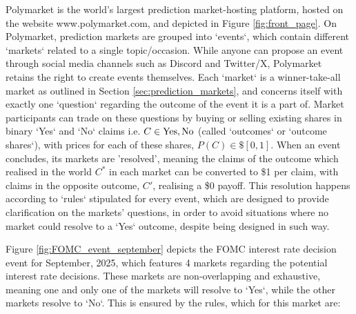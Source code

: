 
Polymarket is the world's largest prediction market-hosting platform, %
hosted on the website www.polymarket.com, and depicted in Figure \ref{fig:front_page}.
On Polymarket, prediction markets are grouped into `events`, which contain different `markets` related to a single topic/occasion.
While anyone can propose an event through social media channels such as Discord and Twitter/X, Polymarket retains the right to create events themselves.
Each `market` is a winner-take-all market as outlined in Section \ref{sec:prediction_markets}, and concerns itself with exactly one `question` regarding the outcome of the event it is a part of. Market participants can trade on these questions by buying or selling existing shares in binary `Yes` and `No` claims i.e. $C \in {\text{Yes}, \text{No}}$ (called `outcomes` or `outcome shares`), with prices for each of these shares, $P(C) \in \$[0, 1]$. %
When an event concludes, its markets are 'resolved', meaning the claims of the outcome which realised in the world $C^*$ in each market can be converted to \$1 per claim, with claims in the opposite outcome, $C'$, realising a \$0 payoff.
This resolution happens according to `rules` stipulated for every event, which are designed to provide clarification on the markets' questions, in order to avoid situations where no market could resolve to a `Yes` outcome, despite being designed in such way.
\citep{PMDocs}

Figure \ref{fig:FOMC_event_september} depicts the FOMC interest rate decision event for September, 2025, which features 4 markets regarding the potential interest rate decisions. These markets are non-overlapping and exhaustive, meaning one and only one of the markets will resolve to `Yes`, while the other markets resolve to `No`. This is ensured by the rules, which for this market are:

